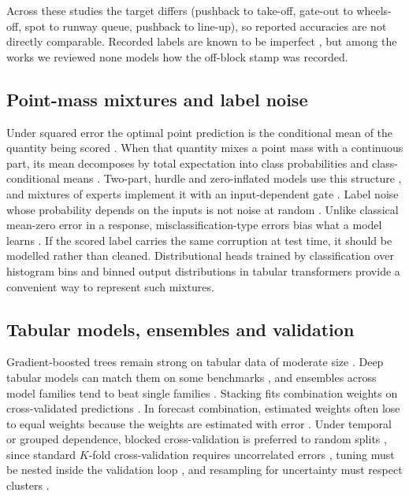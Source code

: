 \documentclass[
  manuscript=article,  %
  layout=preprint,  %
  year=20xx,
  volume=x,
]{extra/joas}
\begin{document}
Across these studies the target differs (pushback to take-off, gate-out to wheels-off, spot to runway queue, pushback to line-up), so reported accuracies are not directly comparable. Recorded labels are known to be imperfect \cite{pujet1999inputoutput,hotle2016using,lee2016taxiout,lordan2016forecasting}, but among the works we reviewed none models how the off-block stamp was recorded.

\subsection{Point-mass mixtures and label noise}

Under squared error the optimal point prediction is the conditional mean of the quantity being scored \cite{gneiting2011making,savage1971elicitation}. When that quantity mixes a point mass with a continuous part, its mean decomposes by total expectation into class probabilities and class-conditional means \cite{belotti2015twopm}. Two-part, hurdle and zero-inflated models use this structure \cite{duan1983comparison,mullahy1986specification,lambert1992zero}, and mixtures of experts implement it with an input-dependent gate \cite{jacobs1991adaptive,jordan1994hierarchical}. Label noise whose probability depends on the inputs is not noise at random \cite{frenay2014classification}. Unlike classical mean-zero error in a response, misclassification-type errors bias what a model learns \cite{hausman2001mismeasured}. If the scored label carries the same corruption at test time, it should be modelled rather than cleaned. Distributional heads trained by classification over histogram bins \cite{imani2018improving,farebrother2024stop} and binned output distributions in tabular transformers \cite{muller2022transformers,hollmann2025accurate} provide a convenient way to represent such mixtures.

\subsection{Tabular models, ensembles and validation}

Gradient-boosted trees \cite{friedman2001greedy,chen2016xgboost,prokhorenkova2018catboost,ke2017lightgbm} remain strong on tabular data of moderate size \cite{grinsztajn2022why,mcelfresh2023when}. Deep tabular models can match them on some benchmarks \cite{gorishniy2021revisiting,holzmuller2024better,gorishniy2025tabm}, and ensembles across model families tend to beat single families \cite{shwartzziv2022tabular,erickson2025tabarena}. Stacking fits combination weights on cross-validated predictions \cite{wolpert1992stacked,breiman1996stacked,vanderlaan2007super}. In forecast combination, estimated weights often lose to equal weights because the weights are estimated with error \cite{smith2009simple,claeskens2016forecast}. Under temporal or grouped dependence, blocked cross-validation is preferred to random splits \cite{roberts2017cross,arlot2010survey}, since standard $K$-fold cross-validation requires uncorrelated errors \cite{bergmeir2018note}, tuning must be nested inside the validation loop \cite{varma2006bias,cawley2010overfitting}, and resampling for uncertainty must respect clusters \cite{field2007bootstrapping,cameron2008bootstrapbased}.
\end{document}
